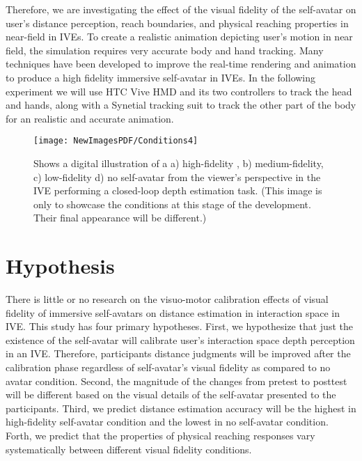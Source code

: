 \cite{J73}

Therefore, we are investigating the effect of the visual fidelity of the self-avatar on user's distance perception, reach boundaries, and physical reaching properties in near-field in IVEs. To create a realistic animation depicting user's motion in near field, the simulation requires very accurate body and hand tracking. Many techniques have been developed to improve the real-time rendering and animation to produce a high fidelity immersive self-avatar in IVEs. In the following experiment we will use HTC Vive HMD and its two controllers to track the head and hands, along with a Synetial tracking suit to track the other part of the body for an realistic and accurate animation.  



\begin{figure}
	\centering
	\texttt{[image: NewImagesPDF/Conditions4]}
	\caption{Shows a digital illustration of a a) high-fidelity , b) medium-fidelity, c) low-fidelity d) no self-avatar from the viewer’s perspective in the IVE performing a closed-loop depth estimation task. (This image is only to showcase the conditions at this stage of the development. Their final appearance will be different.)}
	\label{fig:Self-Avtar_Conditions}
\end{figure}

\section{Hypothesis}

There is little or no research on the visuo-motor calibration effects of visual fidelity of immersive self-avatars on distance estimation in interaction space in IVE. This study has four primary hypotheses. First, we hypothesize that just the existence of the self-avatar will calibrate user's interaction space depth perception in an IVE. Therefore, participants distance judgments will be improved after the calibration phase regardless of self-avatar's visual fidelity as compared to no avatar condition. Second, the magnitude of the changes from pretest to posttest will be different based on the visual details of the self-avatar presented to the participants. Third, we predict distance estimation accuracy will be the highest in high-fidelity  self-avatar condition and the lowest in no self-avatar condition. Forth, we predict that the properties of physical reaching responses vary systematically between different visual fidelity conditions. 


